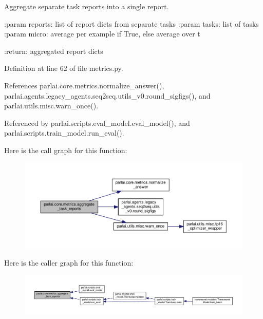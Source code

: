 \begin{DoxyVerb}Aggregate separate task reports into a single report.

:param reports: list of report dicts from separate tasks
:param tasks: list of tasks
:param micro: average per example if True, else average over t

:return: aggregated report dicts
\end{DoxyVerb}
 

Definition at line 62 of file metrics.\+py.



References parlai.\+core.\+metrics.\+normalize\+\_\+answer(), parlai.\+agents.\+legacy\+\_\+agents.\+seq2seq.\+utils\+\_\+v0.\+round\+\_\+sigfigs(), and parlai.\+utils.\+misc.\+warn\+\_\+once().



Referenced by parlai.\+scripts.\+eval\+\_\+model.\+eval\+\_\+model(), and parlai.\+scripts.\+train\+\_\+model.\+run\+\_\+eval().

Here is the call graph for this function\+:
\nopagebreak
\begin{figure}[H]
\begin{center}
\leavevmode
\includegraphics[width=350pt]{namespaceparlai_1_1core_1_1metrics_ae323045c05ed03d93c260521ebb8bf71_cgraph}
\end{center}
\end{figure}
Here is the caller graph for this function\+:
\nopagebreak
\begin{figure}[H]
\begin{center}
\leavevmode
\includegraphics[width=350pt]{namespaceparlai_1_1core_1_1metrics_ae323045c05ed03d93c260521ebb8bf71_icgraph}
\end{center}
\end{figure}
\mbox{\label{namespaceparlai_1_1core_1_1metrics_ae7769a6b628f41081e0f43043d52031a}} 
